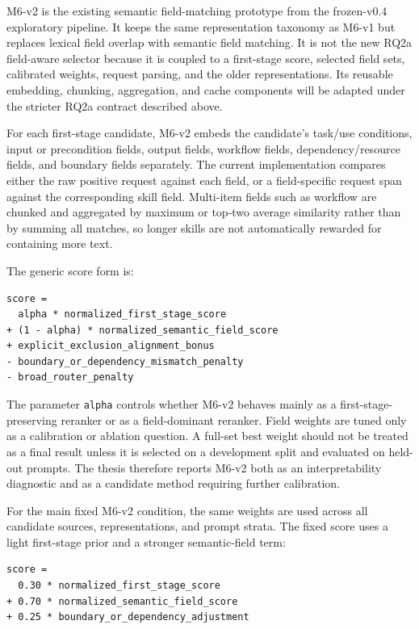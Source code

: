 M6-v2 is the existing semantic field-matching prototype from the frozen-v0.4 exploratory pipeline. It keeps the same representation taxonomy as M6-v1 but replaces lexical field overlap with semantic field matching. It is not the new RQ2a field-aware selector because it is coupled to a first-stage score, selected field sets, calibrated weights, request parsing, and the older representations. Its reusable embedding, chunking, aggregation, and cache components will be adapted under the stricter RQ2a contract described above.

For each first-stage candidate, M6-v2 embeds the candidate's task/use conditions, input or precondition fields, output fields, workflow fields, dependency/resource fields, and boundary fields separately. The current implementation compares either the raw positive request against each field, or a field-specific request span against the corresponding skill field. Multi-item fields such as workflow are chunked and aggregated by maximum or top-two average similarity rather than by summing all matches, so longer skills are not automatically rewarded for containing more text.

The generic score form is:

\begin{verbatim}
score =
  alpha * normalized_first_stage_score
+ (1 - alpha) * normalized_semantic_field_score
+ explicit_exclusion_alignment_bonus
- boundary_or_dependency_mismatch_penalty
- broad_router_penalty
\end{verbatim}

The parameter \texttt{alpha} controls whether M6-v2 behaves mainly as a first-stage-preserving reranker or as a field-dominant reranker. Field weights are tuned only as a calibration or ablation question. A full-set best weight should not be treated as a final result unless it is selected on a development split and evaluated on held-out prompts. The thesis therefore reports M6-v2 both as an interpretability diagnostic and as a candidate method requiring further calibration.

For the main fixed M6-v2 condition, the same weights are used across all candidate sources, representations, and prompt strata. The fixed score uses a light first-stage prior and a stronger semantic-field term:

\begin{verbatim}
score =
  0.30 * normalized_first_stage_score
+ 0.70 * normalized_semantic_field_score
+ 0.25 * boundary_or_dependency_adjustment
\end{verbatim}

